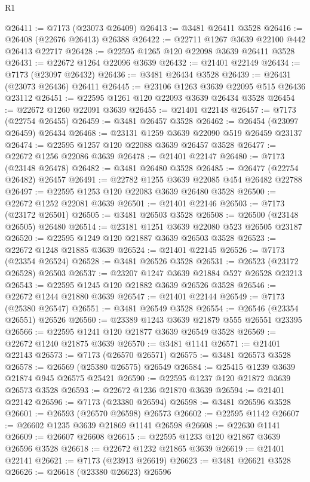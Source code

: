 \begin{lexlean}{R1}
\begin{coremodule}
@26411 := @7173 (@23073 @26409)
@26413 := @3481 @26411 @3528
@26416 := @26408 (@22676 @26413) @26388
@26422 := @22711 @1267 @3639 @22100 @442 @26413 @22717
@26428 := @22595 @1265 @120 @22098 @3639 @26411 @3528
@26431 := @22672 @1264 @22096 @3639
@26432 := @21401 @22149
@26434 := @7173 (@23097 @26432)
@26436 := @3481 @26434 @3528
@26439 := @26431 (@23073 @26436) @26411
@26445 := @23106 @1263 @3639 @22095 @515 @26436 @23112
@26451 := @22595 @1261 @120 @22093 @3639 @26434 @3528
@26454 := @22672 @1260 @22091 @3639
@26455 := @21401 @22148
@26457 := @7173 (@22754 @26455)
@26459 := @3481 @26457 @3528
@26462 := @26454 (@23097 @26459) @26434
@26468 := @23131 @1259 @3639 @22090 @519 @26459 @23137
@26474 := @22595 @1257 @120 @22088 @3639 @26457 @3528
@26477 := @22672 @1256 @22086 @3639
@26478 := @21401 @22147
@26480 := @7173 (@23148 @26478)
@26482 := @3481 @26480 @3528
@26485 := @26477 (@22754 @26482) @26457
@26491 := @22782 @1255 @3639 @22085 @454 @26482 @22788
@26497 := @22595 @1253 @120 @22083 @3639 @26480 @3528
@26500 := @22672 @1252 @22081 @3639
@26501 := @21401 @22146
@26503 := @7173 (@23172 @26501)
@26505 := @3481 @26503 @3528
@26508 := @26500 (@23148 @26505) @26480
@26514 := @23181 @1251 @3639 @22080 @523 @26505 @23187
@26520 := @22595 @1249 @120 @21887 @3639 @26503 @3528
@26523 := @22672 @1248 @21885 @3639
@26524 := @21401 @22145
@26526 := @7173 (@23354 @26524)
@26528 := @3481 @26526 @3528
@26531 := @26523 (@23172 @26528) @26503
@26537 := @23207 @1247 @3639 @21884 @527 @26528 @23213
@26543 := @22595 @1245 @120 @21882 @3639 @26526 @3528
@26546 := @22672 @1244 @21880 @3639
@26547 := @21401 @22144
@26549 := @7173 (@25380 @26547)
@26551 := @3481 @26549 @3528
@26554 := @26546 (@23354 @26551) @26526
@26560 := @23389 @1243 @3639 @21879 @555 @26551 @23395
@26566 := @22595 @1241 @120 @21877 @3639 @26549 @3528
@26569 := @22672 @1240 @21875 @3639
@26570 := @3481 @1141
@26571 := @21401 @22143
@26573 := @7173 (@26570 @26571)
@26575 := @3481 @26573 @3528
@26578 := @26569 (@25380 @26575) @26549
@26584 := @25415 @1239 @3639 @21874 @945 @26575 @25421
@26590 := @22595 @1237 @120 @21872 @3639 @26573 @3528
@26593 := @22672 @1236 @21870 @3639
@26594 := @21401 @22142
@26596 := @7173 (@23380 @26594)
@26598 := @3481 @26596 @3528
@26601 := @26593 (@26570 @26598) @26573
@26602 := @22595 @1142
@26607 := @26602 @1235 @3639 @21869 @1141 @26598
@26608 := @22630 @1141
@26609 := @26607 @26608
@26615 := @22595 @1233 @120 @21867 @3639 @26596 @3528
@26618 := @22672 @1232 @21865 @3639
@26619 := @21401 @22141
@26621 := @7173 (@23913 @26619)
@26623 := @3481 @26621 @3528
@26626 := @26618 (@23380 @26623) @26596

\end{coremodule}
\end{lexlean}
